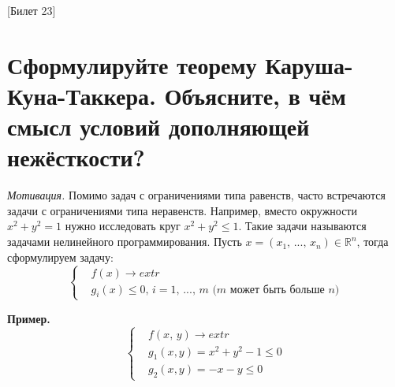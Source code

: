 [Билет 23]

\section{Сформулируйте теорему Каруша-Куна-Таккера. Объясните, в чём смысл условий дополняющей нежёсткости?}
\textit{Мотивация.} Помимо задач с ограничениями типа равенств, часто встречаются задачи с ограничениями типа неравенств.
Например, вместо окружности $x^2 + y^2 = 1$ нужно исследовать круг $x^2 + y^2 \leqslant 1$. Такие задачи называются задачами
нелинейного программирования. Пусть $x = (x_1, \, ..., \, x_n) \in \mathbb{R}^n$, тогда сформулируем задачу:
\[\left\{\begin{aligned}
    &f(x) \to extr \\
    &g_i(x) \leqslant 0, \, i = 1, \,..., \, m \text{ ($m$ может быть больше $n$)}
\end{aligned}\right.\]

\textbf{Пример.}
\[\left\{\begin{aligned}
    &f(x, \, y) \to extr \\
    &g_1(x, y) = x^2 + y^2 - 1 \leqslant 0 \\
    &g_2(x, y) = -x - y \leqslant 0
\end{aligned}\right.\]

\begin{figure}[h]
    \begin{center}
    \end{center}
\end{figure}

